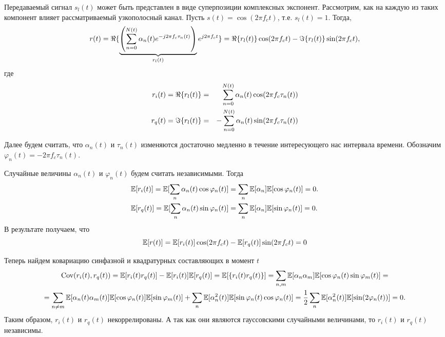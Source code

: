 \documentclass{book}
\numberwithin{theorem}{chapter}
\numberwithin{statement}{chapter}
\numberwithin{lemma}{chapter}
\theoremstyle{definition}
\numberwithin{task}{chapter}
\theoremstyle{remark}
\numberwithin{example}{chapter}
\theoremstyle{definition}
\numberwithin{definition}{chapter}
\theoremstyle{remark}
\theoremstyle{remark}
\numberwithin{lyrics}{section}
\begin{document}
Передаваемый сигнал $s_l(t)$ может быть представлен в виде суперпозиции комплексных экспонент. Рассмотрим, как на каждую из таких компонент влияет рассматриваемый узкополосный канал. Пусть $s(t) = \cos(2\pi f_c t)$, т.е. $s_l(t) = 1$. Тогда,
\begin{equation}
r(t) = \Re\{\underbrace{\left(\sum\limits_{n=0}^{N(t)} \alpha_n(t)e^{-j2\pi f_c \tau_n(t)}\right)}_{r_l(t)} e^{j2\pi f_c t}\} = \Re\{r_l(t)\}  \cos(2\pi f_c t) - \Im\{r_l(t)\} \sin(2\pi f_c t),
\end{equation}
где 
\begin{eqnarray*}
r_i(t) = \Re\{r_l(t)\} &=&  \sum\limits_{n = 0}^{N(t)} \alpha_n(t) \cos(2\pi f_c \tau_n(t))\\
r_q(t) = \Im\{r_l(t)\} &=& -\sum\limits_{n = 0}^{N(t)} \alpha_n(t) \sin(2\pi f_c \tau_n(t))
\end{eqnarray*}

Далее будем считать, что $\alpha_n(t)$ и $\tau_n(t)$ изменяются достаточно медленно в течение интересующего нас интервала времени. Обозначим $\varphi_n(t) = -2\pi f_c \tau_n(t)$. 

Случайные величины $\alpha_n(t)$ и $\varphi_n(t)$ будем считать независимыми. Тогда
\begin{align}
\mathbb{E}[r_i(t)] = \mathbb{E}[\sum\limits_{n}\alpha_n(t) \cos \varphi_n(t) ] &= \sum\limits_n \mathbb{E}[\alpha_n] \mathbb{E}[\cos \varphi_n(t)] = 0. \\
\mathbb{E}[r_q(t)] = \mathbb{E}[\sum\limits_{n}\alpha_n(t) \sin \varphi_n(t) ] &= \sum\limits_n \mathbb{E}[\alpha_n] \mathbb{E}[\sin \varphi_n(t)] = 0.
\end{align}
В результате получаем, что 
$$\mathbb{E}[r(t)] = \mathbb{E}[r_i(t)] \cos(2\pi f_c t) - \mathbb{E}[r_q(t)] \sin(2 \pi f_c t) = 0$$

Теперь найдем ковариацию синфазной и квадратурных составляющих в момент $t$
\begin{gather*}
\text{Cov}(r_i(t), r_q(t)) = \mathbb{E}[r_i(t)r_q(t)] - \mathbb{E}[r_i(t)] \mathbb{E}[r_q(t)] = \mathbb{E}[\{r_i(t) r_q(t)\}] = \sum\limits_{n, m} \mathbb{E}[\alpha_n \alpha_m] \mathbb{E}[\cos\varphi_n(t) \sin\varphi_m(t)] = \\ = \sum\limits_{\substack{n \neq m}} \mathbb{E}[\alpha_n(t)\alpha_m(t)] \mathbb{E}[\cos\varphi_n(t)] \mathbb{E}[\sin\varphi_m(t)] + \sum\limits_n \mathbb{E}[\alpha_n^2(t)] \mathbb{E}[\sin\varphi_n(t) \cos\varphi_n(t)] = \frac{1}{2}\sum\limits_n\mathbb{E}[\alpha_n^2(t)] \mathbb{E}[\sin (2\varphi_n(t))] = 0.
\end{gather*}
Таким образом, $r_i(t)$ и $r_q(t)$ некоррелированы. А так как они являются гауссовскими случайными величинами, то $r_i(t)$ и $r_q(t)$ независимы.
\end{document}
